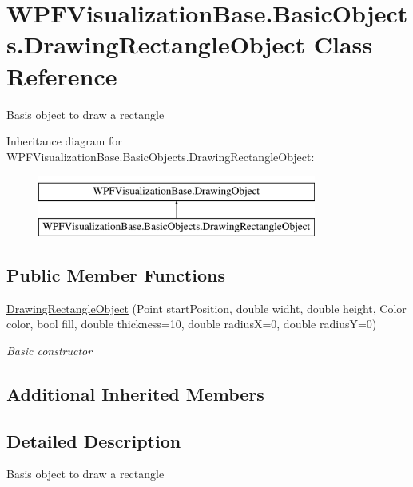 \hypertarget{class_w_p_f_visualization_base_1_1_basic_objects_1_1_drawing_rectangle_object}{}\section{W\+P\+F\+Visualization\+Base.\+Basic\+Objects.\+Drawing\+Rectangle\+Object Class Reference}
\label{class_w_p_f_visualization_base_1_1_basic_objects_1_1_drawing_rectangle_object}


Basis object to draw a rectangle  


Inheritance diagram for W\+P\+F\+Visualization\+Base.\+Basic\+Objects.\+Drawing\+Rectangle\+Object\+:\begin{figure}[H]
\begin{center}
\leavevmode
\includegraphics[height=2.000000cm]{class_w_p_f_visualization_base_1_1_basic_objects_1_1_drawing_rectangle_object}
\end{center}
\end{figure}
\subsection*{Public Member Functions}
\begin{DoxyCompactItemize}
\item 
\hyperlink{class_w_p_f_visualization_base_1_1_basic_objects_1_1_drawing_rectangle_object_ad383ffb49bc9db5468518c164f8e5f19}{Drawing\+Rectangle\+Object} (Point start\+Position, double widht, double height, Color color, bool fill, double thickness=10, double radiusX=0, double radiusY=0)
\begin{DoxyCompactList}\small\item\em Basic constructor \end{DoxyCompactList}\end{DoxyCompactItemize}
\subsection*{Additional Inherited Members}


\subsection{Detailed Description}
Basis object to draw a rectangle 



